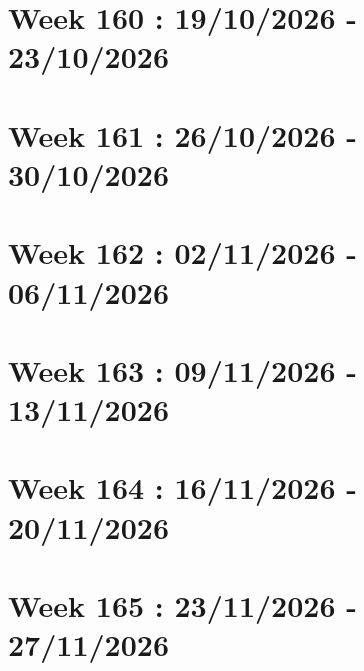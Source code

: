 \documentclass[french]{article}
\begin{document}
	\section{Week 160 : 19/10/2026 - 23/10/2026}

	\section{Week 161 : 26/10/2026 - 30/10/2026}

	\section{Week 162 : 02/11/2026 - 06/11/2026}

	\section{Week 163 : 09/11/2026 - 13/11/2026}

	\section{Week 164 : 16/11/2026 - 20/11/2026}

	\section{Week 165 : 23/11/2026 - 27/11/2026}
\end{document}
